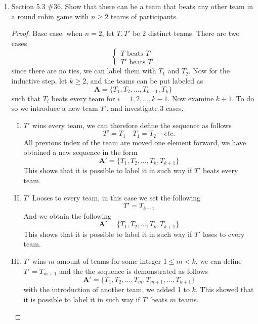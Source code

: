 \documentclass[12pt]{article}
\begin{document}
\begin{enumerate}
        \item Section 5.3 \#36. Show that there can be a team that beats any other team in a round robin game with $n\geq 2$ teams of participants.
            \begin{proof}
                Base case: when $n=2$, let $T, T'$ be 2 distinct teams. There are two cases
                \[
                \begin{cases}
                    T \text{ beats } T'\\
                    T'\text{ beats } T
                \end{cases}
                \]
                since there are no ties, we can label them with $T_1$ and $T_2$. Now for the inductive step, let $k \geq 2$, and the teams can be put labeled as 
                \[
                \mathbf{A} = \{T_{1},T_{2},\ldots,T_{k-1},T_k \}
                \]
                such that $T_i$ beats every team for $i = 1,2,\ldots,k-1$. Now examine $k+1$. To do so we introduce a new team $T'$, and investigate 3 cases.
                    \begin{enumerate}[I.]
                        \item $T'$ wins every team, we can therefore define the sequence as follows
                            \[
                            T'=T_1 \quad T_1 = T_2 \cdots \textit{ etc.}
                            \]
                            All previous index of the team are moved one element forward, we have obtained a new sequence in the form
                            \[
                            \mathbf{A'} = \{T_1, T_2, \ldots, T_k, T_{k+1} \}
                            \]
                            This shows that it is possible to label it in such way if $T'$ beats every team.
                        \item $T'$ Looses to every team, in this case we set the following
                            \[
                            T' = T_{k+1}
                            \]
                            And we obtain the following
                            \[
                            \mathbf{A'} = \{T_1, T_2, \ldots, T_k, T_{k+1} \}
                            \]
                            This shows that it is possible to label it in such way if $T'$ loses to every team.
                        \item $T'$ wins $m$ amount of teams for some integer $1 \leq m < k$, we can define $T' = T_{m+1}$ and the the sequence is demonstrated as follows
                            \[
                            \mathbf{A'} = \{T_1, T_2, \ldots, T_{m},T_{m+1},\ldots,T_{k+1} \}
                            \]
                            with the introduction of another team, we added 1 to $k$. This showed that it is possible to label it in such way if $T'$ beats $m$ teams.
                    \end{enumerate}
               

\end{proof}
\end{enumerate}
\end{document}
